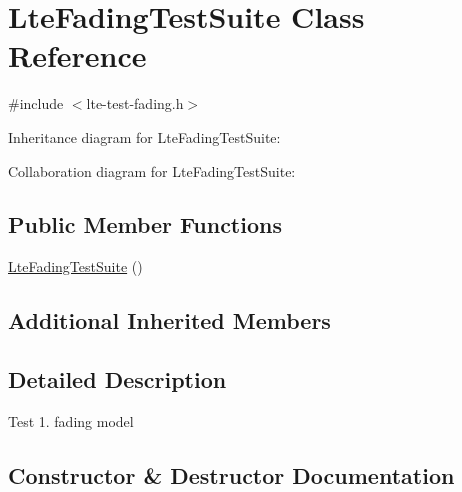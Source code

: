 \hypertarget{classLteFadingTestSuite}{}\section{Lte\+Fading\+Test\+Suite Class Reference}
\label{classLteFadingTestSuite}


{\ttfamily \#include $<$lte-\/test-\/fading.\+h$>$}



Inheritance diagram for Lte\+Fading\+Test\+Suite\+:


Collaboration diagram for Lte\+Fading\+Test\+Suite\+:
\subsection*{Public Member Functions}
\begin{DoxyCompactItemize}
\item 
\hyperlink{classLteFadingTestSuite_aa8f5d146edf68b18fe52196168dcbf90}{Lte\+Fading\+Test\+Suite} ()
\end{DoxyCompactItemize}
\subsection*{Additional Inherited Members}


\subsection{Detailed Description}
Test 1. fading model 

\subsection{Constructor \& Destructor Documentation}
